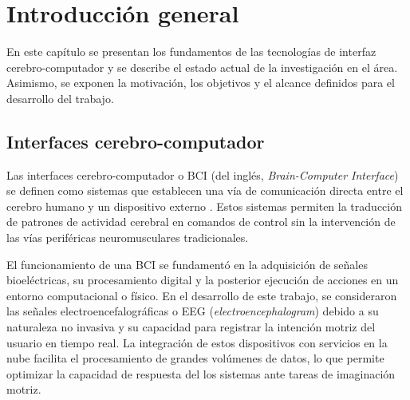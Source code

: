 
\chapter{Introducción general} %

\label{Chapter1} %
\label{IntroGeneral}

En este capítulo se presentan los fundamentos de las tecnologías de interfaz cerebro-computador y se describe el estado actual de la investigación en el área. Asimismo, se exponen la motivación, los objetivos y el alcance definidos para el desarrollo del trabajo.


\newcommand{\keyword}[1]{\textbf{#1}}
\newcommand{\tabhead}[1]{\textbf{#1}}
\newcommand{\code}[1]{\texttt{#1}}
\newcommand{\file}[1]{\texttt{\bfseries#1}}
\newcommand{\option}[1]{\texttt{\itshape#1}}
\newcommand{\grados}{$^{\circ}$}



\section{Interfaces cerebro-computador}

Las interfaces cerebro-computador o BCI (del inglés, \textit{Brain-Computer Interface}) se definen como sistemas que establecen una vía de comunicación directa entre el cerebro humano y un dispositivo externo \cite{wolpaw2002bci}. Estos sistemas permiten la traducción de patrones de actividad cerebral en comandos de control sin la intervención de las vías periféricas neuromusculares tradicionales.

El funcionamiento de una BCI se fundamentó en la adquisición de señales bioeléctricas, su procesamiento digital y la posterior ejecución de acciones en un entorno computacional o físico. En el desarrollo de este trabajo, se consideraron las señales electroencefalográficas o EEG (\textit{electroencephalogram}) debido a su naturaleza no invasiva y su capacidad para registrar la intención motriz del usuario en tiempo real. La integración de estos dispositivos con servicios en la nube facilita el procesamiento de grandes volúmenes de datos, lo que permite optimizar la capacidad de respuesta del los sistemas ante tareas de imaginación motriz.

